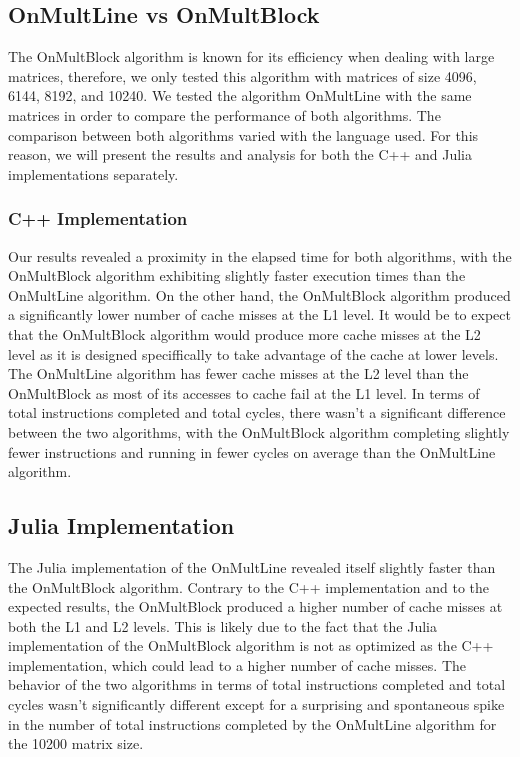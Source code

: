 \documentclass[11pt,a4paper]{article}
\begin{document}
\subsection{OnMultLine vs OnMultBlock}
The OnMultBlock algorithm is known for its efficiency when dealing with large matrices, therefore, we only tested
this algorithm with matrices of size 4096, 6144, 8192, and 10240. We tested the algorithm OnMultLine with the same
matrices in order to compare the performance of both algorithms. The comparison between both algorithms varied with
the language used. For this reason, we will present the results and analysis for both the C++ and Julia 
implementations separately.

\subsubsection{C++ Implementation}
Our results revealed a proximity in the elapsed time for both algorithms, with the OnMultBlock algorithm
exhibiting slightly faster execution times than the OnMultLine algorithm. On the other hand, the OnMultBlock
algorithm produced a significantly lower number of cache misses at the L1 level. It would be to expect that the
OnMultBlock algorithm would produce more cache misses at the L2 level as it is designed speciffically to take
advantage of the cache at lower levels. The OnMultLine algorithm has fewer cache misses at the L2 level than the
OnMultBlock as most of its accesses to cache fail at the L1 level. 
In terms of total instructions completed and total cycles, there wasn't a significant difference between the two
algorithms, with the OnMultBlock algorithm completing slightly fewer instructions and running in fewer cycles on average 
than the OnMultLine algorithm.

\subsection{Julia Implementation}
The Julia implementation of the OnMultLine revealed itself slightly faster than the OnMultBlock algorithm. 
Contrary to the C++ implementation and to the expected results, the OnMultBlock produced a higher number of cache
misses at both the L1 and L2 levels. This is likely due to the fact that the Julia implementation of the OnMultBlock
algorithm is not as optimized as the C++ implementation, which could lead to a higher number of cache misses.
The behavior of the two algorithms in terms of total instructions completed and total cycles wasn't significantly
different except for a surprising and spontaneous spike in the number of total instructions completed by the
OnMultLine algorithm for the 10200 matrix size.
\end{document}
